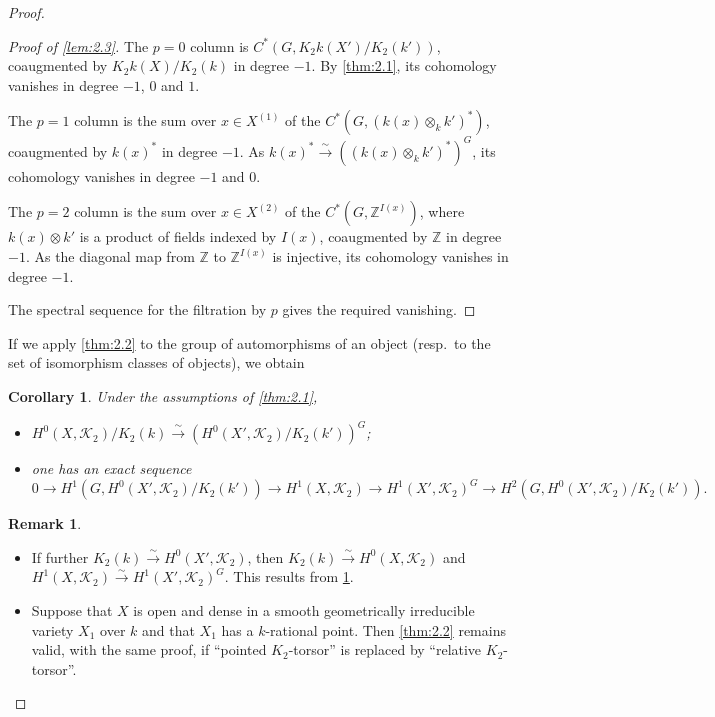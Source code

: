 \documentclass[11pt,a4paper]{article}
\theoremstyle{plain}
\newtheorem{corollary}[theorem]{Corollary}
\theoremstyle{definition}
\newtheorem{remark}[theorem]{Remark}
\newcommand{\cK}{\mathcal{K}}
\newcommand{\bZ}{\mathbb{Z}}
\begin{document}
\begin{proof}
\begin{proof}[Proof of \ref{lem:2.3}]
The $p=0$ column is $C^*(G, K_2k(X')/K_2(k'))$, coaugmented by $K_2k(X)/K_2(k)$ in degree $-1$. By \ref{thm:2.1}, its cohomology vanishes in degree $-1$, $0$ and $1$.

The $p=1$ column is the sum over $x \in X^{(1)}$ of the $C^*(G, (k(x) \otimes_k k')^*)$, coaugmented by $k(x)^*$ in degree $-1$. As $k(x)^* \xrightarrow{\sim} ((k(x) \otimes_k k')^*)^G$, its cohomology vanishes in degree $-1$ and $0$.

The $p=2$ column is the sum over $x \in X^{(2)}$ of the $C^*(G, \bZ^{I(x)})$, where $k(x) \otimes k'$ is a product of fields indexed by $I(x)$, coaugmented by $\bZ$ in degree $-1$. As the diagonal map from $\bZ$ to $\bZ^{I(x)}$ is injective, its cohomology vanishes in degree $-1$.

The spectral sequence for the filtration by $p$ gives the required vanishing.
\end{proof}

If we apply \ref{thm:2.2} to the group of automorphisms of an object (resp.~to the set of isomorphism classes of objects), we obtain

\begin{corollary}\label{cor:2.4}
Under the assumptions of \ref{thm:2.1},
\begin{itemize}
\item[(i)] $H^0(X, \cK_2)/K_2(k) \xrightarrow{\sim} (H^0(X', \cK_2)/K_2(k'))^G$;
\item[(ii)] one has an exact sequence
\[0 \to H^1(G, H^0(X', \cK_2)/K_2(k')) \to H^1(X, \cK_2) \to H^1(X', \cK_2)^G \to H^2(G, H^0(X', \cK_2)/K_2(k')).\]
\end{itemize}
\end{corollary}

\begin{remark}
\begin{itemize}
\item[(i)] If further $K_2(k) \xrightarrow{\sim} H^0(X', \cK_2)$, then $K_2(k) \xrightarrow{\sim} H^0(X, \cK_2)$ and $H^1(X, \cK_2) \xrightarrow{\sim} H^1(X', \cK_2)^G$. This results from \ref{cor:2.4}.
\item[(ii)] Suppose that $X$ is open and dense in a smooth geometrically irreducible variety $X_1$ over $k$ and that $X_1$ has a $k$-rational point. Then \ref{thm:2.2} remains valid, with the same proof, if ``pointed $K_2$-torsor'' is replaced by ``relative $K_2$-torsor''.
\end{itemize}
\end{remark}
\end{proof}
\end{document}
